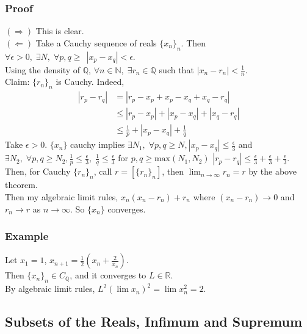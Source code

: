 \documentclass[11pt]{article}
\newcommand{\0}{\emptyset}
\newcommand{\N}{\mathbb{N}}
\newcommand{\Q}{\mathbb{Q}}
\newcommand{\R}{\mathbb{R}}
\begin{document}
\subsubsection*{Proof}
\label{sec:org5ae1f10}
\((\Longrightarrow)\) This is clear.\\[0pt]
\((\Longleftarrow)\) Take a Cauchy sequence of reals \(\{x_{n}\}_{n}\). Then \(\forall\epsilon>0,\;\exists N,\;\forall p,q\geq\,\;|x_{p}-x_{q}|<\epsilon\).\\[0pt]
Using the density of \(\Q\), \(\forall n\in\N,\;\exists r_{n}\in\Q\) such that \(|x_{n}-r_{n}|<\frac{1}{n}\).\\[0pt]
Claim: \(\{r_{n}\}_{n}\) is Cauchy. Indeed,\\[0pt]
\begin{align*}
  |r_{p}-r_{q}|
  &=|r_{p}-x_{p}+x_{p}-x_{q}+x_{q}-r_{q}|
  \\&\leq|r_{p}-x_{p}|+|x_{p}-x_{q}|+|x_{q}-r_{q}|
  \\&\leq\frac{1}{p} +|x_{p}-x_{q}|+\frac{1}{q}
\end{align*}
Take \(\epsilon>0\). \(\{x_{n}\}\) cauchy implies \(\exists N_{1},\;\forall p,q\geq N,|x_{p}-x_{q}|\leq\frac{\epsilon}{3}\) and \(\exists N_{2},\;\forall p,q\geq N_{2},\frac{1}{p}\leq\frac{\epsilon}{3},\;\frac{1}{q}\leq\frac{\epsilon}{3}\) for \(p,q\geq\text{max}(N_{1},N_{2})\) \(|r_{p}-r_{q}|\leq\frac{\epsilon}{3}+\frac{\epsilon}{3}+\frac{\epsilon}{3}\).\\[0pt]
Then, for Cauchy \(\{r_{n}\}_{n}\), call \(r=[\{r_{n}\}_{n}]\), then \(\lim_{n\to\infty}r_{n}=r\) by the above theorem.\\[0pt]
Then my algebraic limit rules, \(x_{n}(x_{n}-r_{n})+r_{n}\) where \((x_{n}-r_{n})\to 0\) and \(r_{n}\to r\) as \(n\to\infty\). So \(\{x_{n}\}\) converges.\\[0pt]
\subsubsection*{Example}
\label{sec:orge72e700}
Let \(x_{1}=1\), \(x_{n+1}=\frac{1}{2}(x_{n}+\frac{2}{x_{n}})\).\\[0pt]
Then \(\{x_{n}\}_{n}\in C_{\Q}\), and it converges to \(L\in\R\).\\[0pt]
By algebraic limit rules, \(L^{2}(\lim x_{n})^{2}=\lim x_{n}^{2}=2\).\\[0pt]
\subsection*{Subsets of the Reals, Infimum and Supremum}
\label{sec:orge5c63a6}
\end{document}
